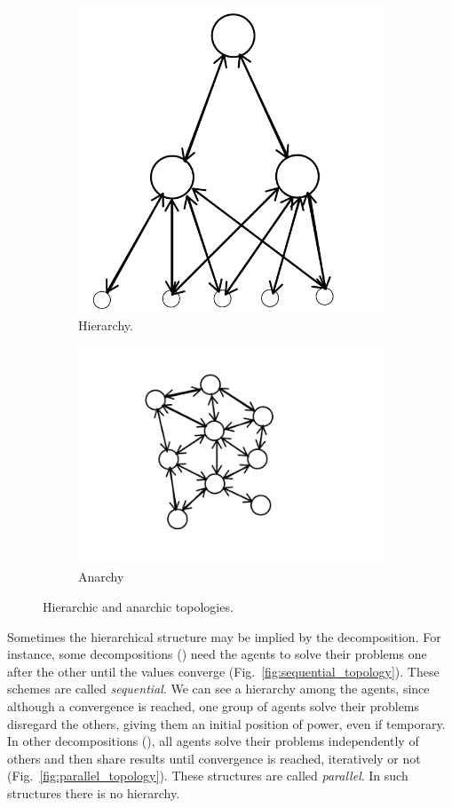 \documentclass[../main.tex]{subfiles}
\begin{document}
\begin{figure}[H]
\begin{subfigure}[b]{.45\textwidth}
  \centering
  \includegraphics[height=.5\textwidth]{../img/hierarchy.png}
  \caption{Hierarchy.}\label{fig:hierarchy_topology}
\end{subfigure}
\hfill
\begin{subfigure}[b]{.45\textwidth}
  \centering
  \includegraphics[height=.5\textwidth]{../img/anarchy.png}
  \caption{Anarchy}\label{fig:anarchy_topology}
\end{subfigure}
\caption{Hierarchic and anarchic topologies.}\label{fig:hierarchic_anarchic}
\end{figure}


Sometimes the hierarchical structure may be implied by the decomposition. For instance, some decompositions () need the agents to solve their problems one after the other until the values converge (Fig.~\ref{fig:sequential_topology}).
These schemes are called \emph{sequential}.
We can see a hierarchy among the agents, since although a convergence is reached, one group of agents solve their problems disregard the others, giving them an initial position of power, even if temporary.
In other decompositions (), all agents solve their problems independently of others and then share results until convergence is reached, iteratively or not (Fig.~\ref{fig:parallel_topology}).
These structures are called \emph{parallel}.
In such structures there is no hierarchy.
\end{document}
